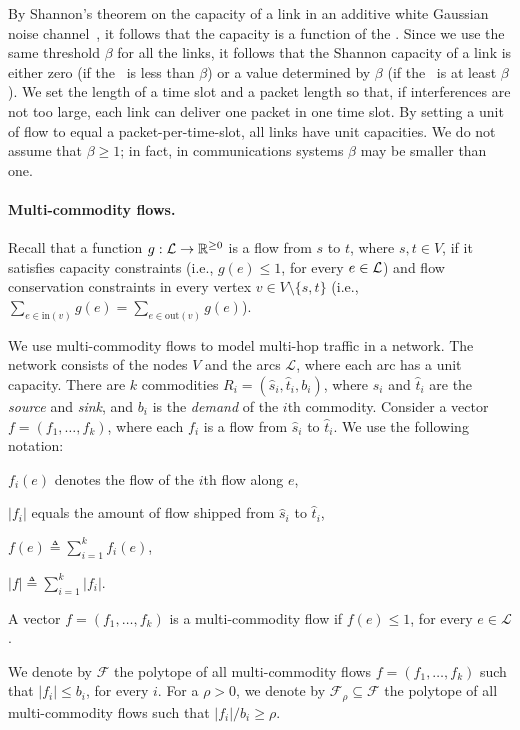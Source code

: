 \documentclass[11pt]{article}
\newenvironment{proof sketch}{\noindent {\bf Proof sketch:} }{\hfill \qed}
\newcommand{\sinr}{\text{\sc{sinr}}}
\newcommand{\LL}{\mathcal{L}}
\newcommand{\FF}{\mathcal{F}}
\newcommand{\eqdf}{\triangleq}
\begin{document}
By Shannon's theorem on the capacity of a link in an additive white
Gaussian noise channel~\cite{gallager1968information}, it follows that the capacity
is a function of the \sinr. Since we use the same threshold $\beta$
for all the links, it follows that
the Shannon capacity of a link is either zero (if the \sinr\ is less than $\beta$)
or a value determined by $\beta$ (if the \sinr\ is at least $\beta$).
We set the length of a time slot and a packet length so that, if
interferences are not too large, each link can deliver one packet in one
time slot.  By setting a unit of flow to equal a packet-per-time-slot, all
links have unit capacities.
We do not assume that $\beta \geq 1$; in fact,
in communications systems $\beta$ may be smaller than one.

\paragraph{Multi-commodity flows.}
Recall that a function $g: {\cal L} \rightarrow {\mathbb{R}}^{\geq 0}$
is a flow from $s$ to $t$, where $s,t \in V$, if it satisfies capacity
constraints (i.e., $g(e) \leq 1$, for every $e \in {\cal L}$) and flow conservation
constraints in every vertex $v \in V \setminus \{s,t\}$ (i.e., $\sum_{e \in \text{in}(v)}g(e)=\sum_{e\in \text{out}(v)}g(e)$).

We use multi-commodity flows to model multi-hop traffic in a network.
The network consists of the nodes $V$ and the arcs $\LL$, where
each arc has a unit capacity.  There are $k$ commodities
$R_i=({\hat s}_i,{\hat t}_i,b_i)$, where ${\hat s}_i$ and ${\hat t}_i$ are the \emph{source} and
\emph{sink}, and $b_i$ is the \emph{demand} of the $i$th commodity.
Consider a vector $f=(f_1,\ldots,f_k)$, where each
$f_i$ is a flow from ${\hat s}_i$ to ${\hat t}_i$.
We use the following notation:
\begin{inparaenum}[(i)]
\item $f_i(e)$ denotes the flow of the $i$th flow along $e$,
\item $|f_i|$ equals the amount of flow shipped from ${\hat s}_i$ to ${\hat t}_i$,
\item $f(e)\eqdf\sum_{i=1}^k f_i(e)$,
\item $|f| \eqdf \sum_{i=1}^k |f_i|$.
\end{inparaenum}
A vector $f=(f_1,\ldots,f_k)$ is a multi-commodity flow if $f(e) \leq 1$,
for every $e \in \LL$.

We denote by $\FF$ the polytope of all multi-commodity flows $f=(f_1,\ldots,f_k)$
such that $|f_i|\leq b_i$, for every $i$.
For a $\rho>0$, we denote by $\FF_\rho\subseteq \FF$ the polytope of
all multi-commodity flows such that $|f_i|/b_i\geq \rho$.
\end{document}
